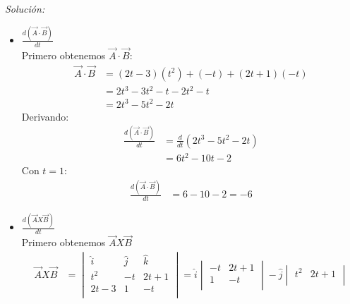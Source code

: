 \documentclass[12pt,openany]{book}
\begin{document}
				\noindent\textsl{Soluci\'on:}
				\begin{itemize}
					\item $\frac{d(\vec{A}\cdot\vec{B})}{dt}$						\\
						Primero obtenemos $\vec{A}\cdot\vec{B}$:
						\begin{equation*}
							\begin{split}
								\vec{A}\cdot\vec{B}&=(2t-3)(t^{2})+(-t)+(2t+1)(-t)	\\
												   &=2t^{3}-3t^{2}-t-2t^{2}-t 		\\
												   &=2t^{3}-5t^{2}-2t
							\end{split}
						\end{equation*}
						Derivando:
						\begin{equation*}
							\begin{split}
								\frac{d(\vec{A}\cdot\vec{B})}{dt}&=\frac{d}{dt}(2t^{3}-5t^{2}-2t)\\
																 &=6t^{2}-10t-2
							\end{split}
						\end{equation*}
						Con $t=1$:
						\begin{equation*}
							\begin{split}
								\frac{d(\vec{A}\cdot\vec{B})}{dt}&=6-10-2=-6
							\end{split}
						\end{equation*}
					\item $\frac{d(\vec{A}X\vec{B})}{dt}$							\\
						Primero obtenemos $\vec{A}X\vec{B}$
						\begin{equation*}
							\begin{split}
								\vec{A}X\vec{B}&=\begin{vmatrix}
				 									\hat{i} & \hat{j} & \hat{k} 	\\
				 									   t^{2}  &   -t    &    2t+1   \\
				 									   2t-3   &    1    &     -t   	\\    
				 								\end{vmatrix}
				 								=\hat{i} \begin{vmatrix}
				 	    										-t & 2t+1 			\\
				 	    										 1 &  -t  			\\
				 	    									\end{vmatrix}
				 	    							-\hat{j}\begin{vmatrix}
				 	    										t^{2} & 2t+1 		\\

\end{vmatrix}
\end{split}
\end{equation*}
\end{itemize}
\end{document}
